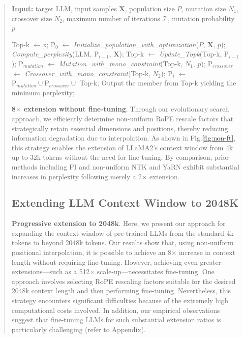 \begin{abstract}
\begin{algorithm}[t]
	\small
	\caption{The search algorithm}
	\textbf{Input:} target LLM, input samples $\mathbf{X}$, population size $P$, mutation size $N_1$, crossover size $N_2$, maximum number of iterations $\mathcal{T}$, mutation probability $p$\\

	\begin{algorithmic}[1]
		\label{alg:search}
		\STATE Top-k $\gets \phi$;	
		\STATE $\text{P}_0$ $\gets$ \textit{Initialize\_population\_with\_optimization}($P$, $\mathbf{X}$, $p$); 
		\STATE \textit{Compute\_perplexity}(LLM, $\text{P}_{i-1}$, $\mathbf{X}$);
		\STATE Top-k $\gets$ \textit{Update\_Topk}(Top-k, $\text{P}_{i-1}$);
		\STATE $\text{P}_{mutation}$ $\gets$ \textit{Mutation\_with\_mono\_constraint}(Top-k, $N_1$, $p$); 
		\STATE $\text{P}_{crossover}$ $\gets$ \textit{Crossover\_with\_mono\_constraint}(Top-k, $N_2$);
		\STATE $\text{P}_i$ $\gets$ $\text{P}_{mutation} \cup \text{P}_{crossover} \cup$ Top-k;
		\ENDFOR
		\STATE Output the member from Top-k yielding the minimum perplexity;
	\end{algorithmic}
\end{algorithm}

\textbf{8$\times$ extension without fine-tuning}. Through our evolutionary search approach, we efficiently determine non-uniform RoPE rescale factors that strategically retain essential dimensions and positions, thereby reducing information degradation due to interpolation. As shown in Fig.\ref{fig:non-ft}, this strategy enables the extension of LLaMA2's context window from 4k up to 32k tokens without the need for fine-tuning. By comparison, prior methods including PI and non-uniform NTK and YaRN exhibit substantial increases in perplexity following merely a 2$\times$ extension.

\subsection{Extending LLM Context Window to 2048K}
\label{sec:extendto2048k}

\textbf{Progressive extension to 2048k}. Here, we present our approach for expanding the context window of pre-trained LLMs from the standard 4k tokens to beyond 2048k tokens. Our results show that, using non-uniform positional interpolation, it is possible to achieve an 8$\times$ increase in context length without requiring fine-tuning. However, achieving even greater extensions—such as a 512$\times$ scale-up—necessitates fine-tuning. One approach involves selecting RoPE rescaling factors suitable for the desired 2048k context length and then performing fine-tuning. Nevertheless, this strategy encounters significant difficulties because of the extremely high computational costs involved. In addition, our empirical observations suggest that fine-tuning LLMs for such substantial extension ratios is particularly challenging (refer to Appendix).


\end{abstract}

